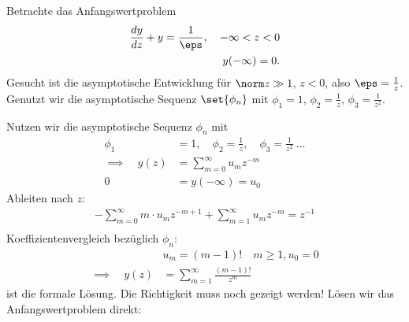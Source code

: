 \begin{beispiel}\label{ex:3-4}
  Betrachte das Anfangswertproblem
  \begin{align*}
    \frac{dy}{dz} + y = \frac 1 \eps, \quad - \infty < z <0\\
    y(- \infty) = 0. 
  \end{align*}
Gesucht ist die asymptotische Entwicklung für $\norm z \gg 1$, $z <0$, also $\eps = \frac 1 z$. Genutzt wir die asymptotische Sequenz $\set{\phi_{n}}$ mit $\phi_{1} = 1$, $\phi_{2} = \frac 1 z$, $\phi_{3}= \frac 1 {z^{2}}$. 

Nutzen wir die asymptotische Sequenz $\phi_{n}$ mit
\begin{align*}
  \phi_{1} &= 1, \quad \phi_{2} = \frac 1z, \quad \phi_{3} = \frac 1{z^{2}}\ \dots\\
\implies \quad y(z) &= \sum_{m = 0}^{\infty} u_{m} z^{-m}\\
0 &= y(- \infty) = u_{0}
\end{align*}
Ableiten nach $z$: 
\begin{align*}
  -\sum_{m = 0}^{\infty} m\cdot u_{m} z^{-m+1} +\sum_{m = 1}^{\infty} u_{m} z^{-m} = z^{-1}\\
\end{align*}
Koeffizientenvergleich bezüglich $\phi_{n}$:
\begin{align*}
& u_{m} = (m-1)!\quad m\geq 1, u_{0} = 0\\
\implies \quad y(z) &= \sum_{m = 1}^{\infty} \frac{(m-1)!}{z^{m}}
\end{align*}
ist die formale Lösung. Die Richtigkeit muss noch gezeigt werden! Lösen wir das Anfangswertproblem direkt: 


\end{beispiel}
